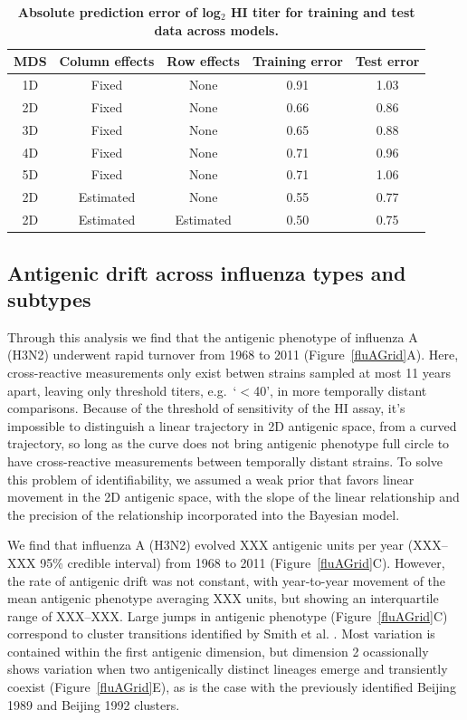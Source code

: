 \documentclass[11pt,oneside,letterpaper]{article}
\begin{document}
\begin{table}[tb]
	\centering
	\caption{\textbf{Absolute prediction error of log$_2$ HI titer for training and test data across models.}}
	\label{errortable}
	\begin{tabular}{ c c c c c } 
	\hline
	MDS 	& 	Column effects 	&	Row effects	& 	Training error	& 	Test error	\\
	\hline	
	1D 		&	Fixed 			&	None		& 	0.91			&	1.03		\\	
	2D 		&	Fixed 			&	None		& 	0.66			&	0.86		\\
	3D 		&	Fixed 			&	None		& 	0.65			&	0.88		\\
	4D 		&	Fixed 			&	None		& 	0.71			&	0.96		\\
	5D 		&	Fixed 			&	None		& 	0.71			&	1.06		\\	
	2D 		&	Estimated 		&	None		& 	0.55			&	0.77		\\	
	2D 		&	Estimated 		&	Estimated	& 	0.50			&	0.75		\\		
	\hline
	\end{tabular}
\end{table}

\subsection*{Antigenic drift across influenza types and subtypes}

Through this analysis we find that the antigenic phenotype of influenza A (H3N2) underwent rapid turnover from 1968 to 2011 (Figure~\ref{fluAGrid}A).  
Here, cross-reactive measurements only exist betwen strains sampled at most 11 years apart, leaving only threshold titers, e.g.\ `$<$40', in more temporally distant comparisons.  
Because of the threshold of sensitivity of the HI assay, it's impossible to distinguish a linear trajectory in 2D antigenic space, from a curved trajectory, so long as the curve does not bring antigenic phenotype full circle to have cross-reactive measurements between temporally distant strains.
To solve this problem of identifiability, we assumed a weak prior that favors linear movement in the 2D antigenic space, with the slope of the linear relationship and the precision of the relationship incorporated into the Bayesian model.

We find that influenza A (H3N2) evolved XXX antigenic units per year (XXX--XXX 95\% credible interval) from 1968 to 2011 (Figure~\ref{fluAGrid}C).
However, the rate of antigenic drift was not constant, with year-to-year movement of the mean antigenic phenotype averaging XXX units, but showing an interquartile range of XXX--XXX.  
Large jumps in antigenic phenotype (Figure~\ref{fluAGrid}C) correspond to cluster transitions identified by Smith et al. \cite{Smith04}.  
Most variation is contained within the first antigenic dimension, but dimension 2 ocassionally shows variation when two antigenically distinct lineages emerge and transiently coexist (Figure~\ref{fluAGrid}E), as is the case with the previously identified Beijing 1989 and Beijing 1992 clusters.
\end{document}
